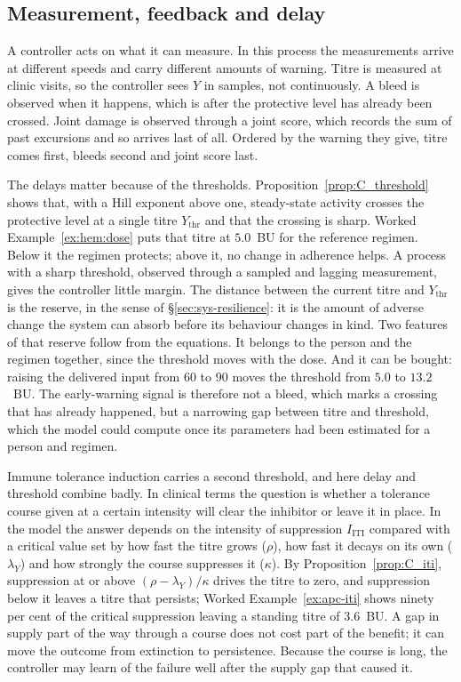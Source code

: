 \subsection{Measurement, feedback and delay}

A controller acts on what it can measure. In this process the measurements arrive at different speeds and carry different amounts of warning. Titre is measured at clinic visits, so the controller sees $Y$ in samples, not continuously. A bleed is observed when it happens, which is after the protective level has already been crossed. Joint damage is observed through a joint score, which records the sum of past excursions and so arrives last of all. Ordered by the warning they give, titre comes first, bleeds second and joint score last.

The delays matter because of the thresholds. Proposition~\ref{prop:C_threshold} shows that, with a Hill exponent above one, steady-state activity crosses the protective level at a single titre $Y_{\text{thr}}$ and that the crossing is sharp. Worked Example~\ref{ex:hem:dose} puts that titre at $5.0$~BU for the reference regimen. Below it the regimen protects; above it, no change in adherence helps. A process with a sharp threshold, observed through a sampled and lagging measurement, gives the controller little margin. The distance between the current titre and $Y_{\text{thr}}$ is the reserve, in the sense of \S\ref{sec:sys-resilience}: it is the amount of adverse change the system can absorb before its behaviour changes in kind. Two features of that reserve follow from the equations. It belongs to the person and the regimen together, since the threshold moves with the dose. And it can be bought: raising the delivered input from $60$ to $90$ moves the threshold from $5.0$ to $13.2$~BU. The early-warning signal is therefore not a bleed, which marks a crossing that has already happened, but a narrowing gap between titre and threshold, which the model could compute once its parameters had been estimated for a person and regimen.

Immune tolerance induction carries a second threshold, and here delay and threshold combine badly. In clinical terms the question is whether a tolerance course given at a certain intensity will clear the inhibitor or leave it in place. In the model the answer depends on the intensity of suppression $I_{\text{ITI}}$ compared with a critical value set by how fast the titre grows ($\rho$), how fast it decays on its own ($\lambda_Y$) and how strongly the course suppresses it ($\kappa$). By Proposition~\ref{prop:C_iti}, suppression at or above $(\rho-\lambda_Y)/\kappa$ drives the titre to zero, and suppression below it leaves a titre that persists; Worked Example~\ref{ex:apc-iti} shows ninety per cent of the critical suppression leaving a standing titre of $3.6$~BU. A gap in supply part of the way through a course does not cost part of the benefit; it can move the outcome from extinction to persistence. Because the course is long, the controller may learn of the failure well after the supply gap that caused it.

